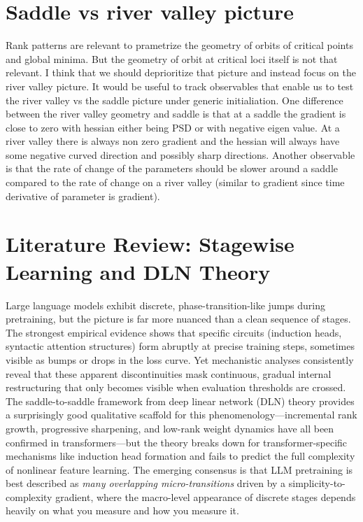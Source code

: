 \documentclass{article}
\theoremstyle{definition}
\begin{document}
\section{Saddle vs river valley picture}
Rank patterns are relevant to prametrize the geometry of orbits of critical points and global minima. But the geometry of orbit at critical loci itself is not that relevant. I think that we should deprioritize that picture and instead focus on the river valley picture. It would be useful to track observables that enable us to test the river valley vs the saddle picture under generic initialiation. One difference between the river valley geometry and saddle is that at a saddle the gradient is close to zero with hessian either being PSD or with negative eigen value. At a river valley there is always non zero gradient and the hessian will always have some negative curved direction and possibly sharp directions. Another observable is that the rate of change of the parameters should be slower around a saddle compared to the rate of change on a river valley (similar to gradient since time derivative of parameter is gradient).  
\section{Literature Review: Stagewise Learning and DLN Theory}
Large language models exhibit discrete, phase-transition-like jumps during pretraining, but the picture is far more nuanced than a clean sequence of stages. The strongest empirical evidence shows that specific circuits (induction heads, syntactic attention structures) form abruptly at precise training steps, sometimes visible as bumps or drops in the loss curve. Yet mechanistic analyses consistently reveal that these apparent discontinuities mask continuous, gradual internal restructuring that only becomes visible when evaluation thresholds are crossed. The saddle-to-saddle framework from deep linear network (DLN) theory provides a surprisingly good qualitative scaffold for this phenomenology---incremental rank growth, progressive sharpening, and low-rank weight dynamics have all been confirmed in transformers---but the theory breaks down for transformer-specific mechanisms like induction head formation and fails to predict the full complexity of nonlinear feature learning. The emerging consensus is that LLM pretraining is best described as \emph{many overlapping micro-transitions} driven by a simplicity-to-complexity gradient, where the macro-level appearance of discrete stages depends heavily on what you measure and how you measure it.
\end{document}
